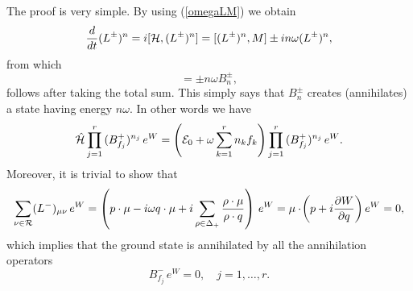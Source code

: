 \documentclass[a4paper,12pt]{article}
\begin{document}
\bigskip
The proof is very simple.
By using (\ref{omegaLM}) we obtain
\begin{equation}
   {d\over dt}{(L^\pm)^n}=i[{\cal H},(L^\pm)^n]
   =[(L^{\pm})^n,{M}]\pm in\omega (L^{\pm})^n,
   \label{nomegaLM}
\end{equation}
from which
\begin{equation}
   [{\cal H}, B_n^\pm]=\pm n\omega B_n^\pm,
\end{equation}
follows after taking the total sum.
This simply says that \(B_n^\pm\) creates (annihilates)
a state having energy \(n\omega\).
In other words we have
\[
   \hat{\cal H}\prod_{j=1}^r\,(B_{f_j}^+)^{n_{j}}\,e^W
   =\left({\cal E}_0+\omega
   \sum_{k=1}^rn_k f_k\right)\prod_{j=1}^r\,(B_{f_j}^+)^{n_{j}}\,e^W.
\]
Moreover, it is trivial to show that
\begin{equation}
   \sum_{\nu\in{\cal R}}(L^-)_{\mu\nu}\,e^W=
    \left(p\cdot\mu-i\omega q\cdot\mu
   +i\sum_{\rho\in\Delta_+}{\rho\cdot\mu\over{\rho\cdot q}}\right)\,e^W=
   \mu\cdot\!\left(p+i{\partial W\over{\partial q}}\right)e^W=0,
\end{equation}
which implies that the ground state is annihilated by all the
annihilation operators
\begin{equation}
   B_{f_j}^-\,e^W=0,\quad j=1,\ldots,r.
\end{equation}
\end{document}
